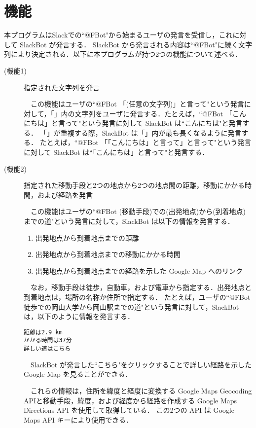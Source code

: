 \documentclass[12pt]{jsarticle}
\begin{document}
\section{機能}\label{function}
本プログラムはSlackでの``@FBot"から始まるユーザの発言を受信し，これに対して SlackBot が発言する． SlackBot から発言される内容は``@FBot"に続く文字列により決定される．以下に本プログラムが持つ2つの機能について述べる．
\begin{description}
\item [(機能1)] 指定された文字列を発言

　この機能はユーザの``@FBot 「(任意の文字列)」と言って"という発言に対して，「」内の文字列をユーザに発言する．たとえば，``@FBot 「こんにちは」と言って"という発言に対して SlackBot は``こんにちは"と発言する．
「」が重複する際，SlackBot は「」内が最も長くなるように発言する．
たとえば，``@FBot 「「こんにちは」と言って」と言って"という発言に対して SlackBot は``「こんにちは」と言って"と発言する．

\item [(機能2)] 指定された移動手段と2つの地点から2つの地点間の距離，移動にかかる時間，および経路を発言

　この機能はユーザの``@FBot (移動手段)での(出発地点)から(到着地点)までの道"という発言に対して，SlackBot は以下の情報を発言する．

\begin{enumerate}
\item 出発地点から到着地点までの距離
\item 出発地点から到着地点までの移動にかかる時間
\item 出発地点から到着地点までの経路を示した Google Map へのリンク
\end{enumerate}

　なお，移動手段は徒歩，自動車，および電車から指定する．出発地点と到着地点は，場所の名称か住所で指定する．
たとえば，ユーザの``@FBot 徒歩での岡山大学から岡山駅までの道"という発言に対して，SlackBot は，以下のように情報を発言する．
    \begin{verbatim}
距離は2.9 km
かかる時間は37分
詳しい道はこちら
    \end{verbatim}
　SlackBot が発言した``こちら"をクリックすることで詳しい経路を示した Google Map を見ることができる．

　これらの情報は，住所を緯度と経度に変換する Google Maps Geocoding API\cite{GoogleMapsGeocoding}と移動手段，緯度，および経度から経路を作成する Google Maps Directions API\cite{GoogleMapsDirections} を使用して取得している．
この2つの API は Google Maps API キーにより使用できる．
\end{description}
\end{document}
